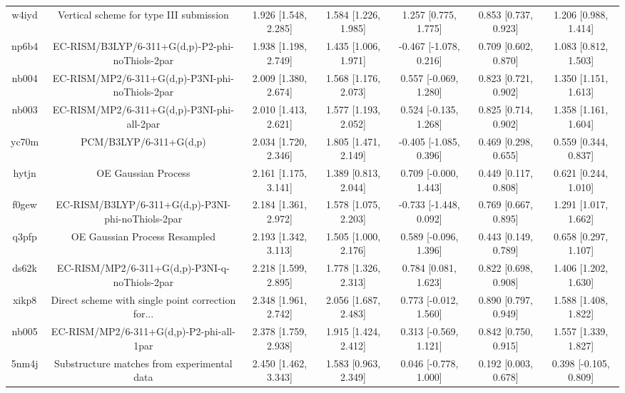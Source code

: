 \documentclass{article}
\begin{document}
\begin{center}
\begin{longtable}{|ccccccc|}
 w4iyd &            Vertical scheme for type III submission &  1.926 [1.548, 2.285] &  1.584 [1.226, 1.985] &     1.257 [0.775, 1.775] &  0.853 [0.737, 0.923] &   1.206 [0.988, 1.414] \\
 np6b4 &    EC-RISM/B3LYP/6-311+G(d,p)-P2-phi-noThiols-2par &  1.938 [1.198, 2.749] &  1.435 [1.006, 1.971] &   -0.467 [-1.078, 0.216] &  0.709 [0.602, 0.870] &   1.083 [0.812, 1.503] \\
 nb004 &    EC-RISM/MP2/6-311+G(d,p)-P3NI-phi-noThiols-2par &  2.009 [1.380, 2.674] &  1.568 [1.176, 2.073] &    0.557 [-0.069, 1.280] &  0.823 [0.721, 0.902] &   1.350 [1.151, 1.613] \\
 nb003 &         EC-RISM/MP2/6-311+G(d,p)-P3NI-phi-all-2par &  2.010 [1.413, 2.621] &  1.577 [1.193, 2.052] &    0.524 [-0.135, 1.268] &  0.825 [0.714, 0.902] &   1.358 [1.161, 1.604] \\
 yc70m &                             PCM/B3LYP/6-311+G(d,p) &  2.034 [1.720, 2.346] &  1.805 [1.471, 2.149] &   -0.405 [-1.085, 0.396] &  0.469 [0.298, 0.655] &   0.559 [0.344, 0.837] \\
 hytjn &                                OE Gaussian Process &  2.161 [1.175, 3.141] &  1.389 [0.813, 2.044] &    0.709 [-0.000, 1.443] &  0.449 [0.117, 0.808] &   0.621 [0.244, 1.010] \\
 f0gew &  EC-RISM/B3LYP/6-311+G(d,p)-P3NI-phi-noThiols-2par &  2.184 [1.361, 2.972] &  1.578 [1.075, 2.203] &   -0.733 [-1.448, 0.092] &  0.769 [0.667, 0.895] &   1.291 [1.017, 1.662] \\
 q3pfp &                      OE Gaussian Process Resampled &  2.193 [1.342, 3.113] &  1.505 [1.000, 2.176] &    0.589 [-0.096, 1.396] &  0.443 [0.149, 0.789] &   0.658 [0.297, 1.107] \\
 ds62k &      EC-RISM/MP2/6-311+G(d,p)-P3NI-q-noThiols-2par &  2.218 [1.599, 2.895] &  1.778 [1.326, 2.313] &     0.784 [0.081, 1.623] &  0.822 [0.698, 0.908] &   1.406 [1.202, 1.630] \\
 xikp8 &  Direct scheme with single point correction for... &  2.348 [1.961, 2.742] &  2.056 [1.687, 2.483] &    0.773 [-0.012, 1.560] &  0.890 [0.797, 0.949] &   1.588 [1.408, 1.822] \\
 nb005 &           EC-RISM/MP2/6-311+G(d,p)-P2-phi-all-1par &  2.378 [1.759, 2.938] &  1.915 [1.424, 2.412] &    0.313 [-0.569, 1.121] &  0.842 [0.750, 0.915] &   1.557 [1.339, 1.827] \\
 5nm4j &        Substructure matches from experimental data &  2.450 [1.462, 3.343] &  1.583 [0.963, 2.349] &    0.046 [-0.778, 1.000] &  0.192 [0.003, 0.678] &  0.398 [-0.105, 0.809] \\

\end{longtable}
\end{center}
\end{document}
